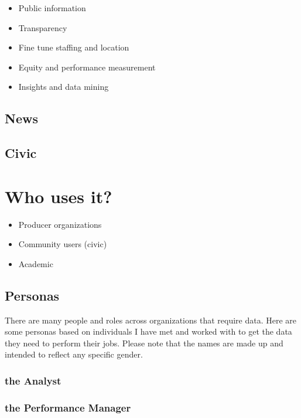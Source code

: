 \documentclass[
]{book}
\providecommand{\tightlist}{%
  \setlength{\itemsep}{0pt}\setlength{\parskip}{0pt}}
\begin{document}
\begin{itemize}
\tightlist
\item
  Public information
\item
  Transparency
\item
  Fine tune staffing and location
\item
  Equity and performance measurement
\item
  Insights and data mining
\end{itemize}

\hypertarget{news}{%
\subsection{News}\label{news}}

\hypertarget{civic}{%
\subsection{Civic}\label{civic}}

\hypertarget{who-uses-it}{%
\section{Who uses it?}\label{who-uses-it}}

\begin{itemize}
\tightlist
\item
  Producer organizations
\item
  Community users (civic)
\item
  Academic
\end{itemize}

\hypertarget{personas}{%
\subsection{Personas}\label{personas}}

There are many people and roles across organizations that require data. Here are some personas based on individuals I have met and worked with to get the data they need to perform their jobs. Please note that the names are made up and intended to reflect any specific gender.

\hypertarget{the-analyst}{%
\subsubsection{the Analyst}\label{the-analyst}}

\hypertarget{the-performance-manager}{%
\subsubsection{the Performance Manager}\label{the-performance-manager}}
\end{document}
